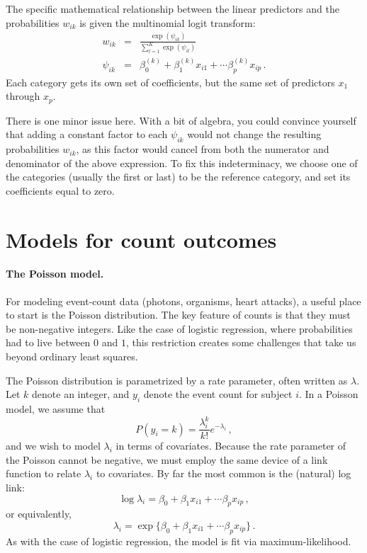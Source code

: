 \documentclass[11pt]{article}
\newcommand{\1}[1]{\mathbf{1}_{\{ {#1} \}}}
\begin{document}
The specific mathematical relationship between the linear predictors and the probabilities $w_{ik}$ is given the multinomial logit transform:
\begin{eqnarray*}
w_{ik} &=& \frac{\exp(\psi_{ik})}{ \sum_{l=1}^K \exp(\psi_{il}) } \\
\psi_{ik} &=& \beta_0^{(k)} + \beta_1^{(k)} x_{i1} + \cdots \beta_p^{(k)} x_{ip} \, .
\end{eqnarray*}
Each category gets its own set of coefficients, but the same set of predictors $x_1$ through $x_p$.

There is one minor issue here.  With a bit of algebra, you could convince yourself that adding a constant factor to each $\psi_{ik}$ would not change the resulting probabilities $w_{ik}$, as this factor would cancel from both the numerator and denominator of the above expression.  To fix this indeterminacy, we choose one of the categories (usually the first or last) to be the reference category, and set its coefficients equal to zero.


\section{Models for count outcomes}

\paragraph{The Poisson model.}

For modeling event-count data (photons, organisms, heart attacks), a useful place to start is the Poisson distribution.  The key feature of counts is that they must be non-negative integers.  Like the case of logistic regression, where probabilities had to live between $0$ and $1$, this restriction creates some challenges that take us beyond ordinary least squares.

The Poisson distribution is parametrized by a rate parameter, often written as $\lambda$.  Let $k$ denote an integer, and $y_i$ denote the event count for subject $i$.  In a Poisson model, we assume that
$$
P(y_i = k) = \frac{\lambda_i^k}{k!} e^{-\lambda_i} \, ,
$$
and we wish to model $\lambda_i$ in terms of covariates.  Because the rate parameter of the Poisson cannot be negative, we must employ the same device of a link function to relate $\lambda_i$ to covariates.  By far the most common is the (natural) log link:
$$
\log \lambda_i = \beta_0 + \beta_1 x_{i1} + \cdots \beta_p x_{ip} \, ,
$$
or equivalently,
$$
 \lambda_i = \exp \{ \beta_0 + \beta_1 x_{i1} + \cdots \beta_p x_{ip} \} \, .
$$
As with the case of logistic regression, the model is fit via maximum-likelihood.
\end{document}
